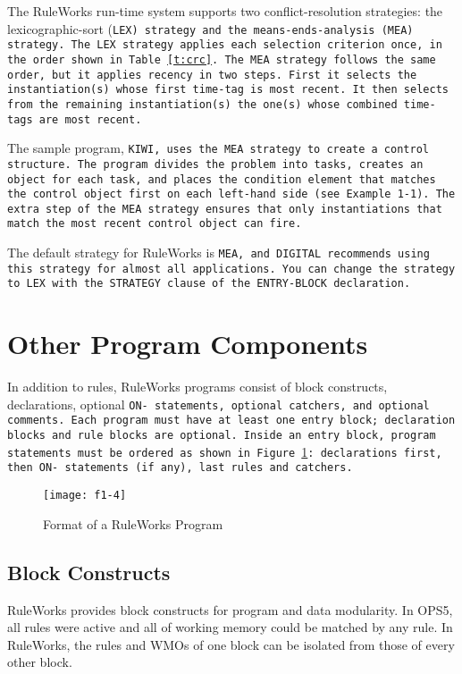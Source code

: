 The RuleWorks run-time system supports two conflict-resolution
strategies: the lexicographic-sort (\tt{LEX}) strategy and the
means-ends-analysis (\tt{MEA}) strategy. The \tt{LEX} strategy applies
each selection criterion once, in the order shown in
Table~\ref{t:crc}. The \tt{MEA} strategy follows the same order, but
it applies recency in two steps. First it selects the instantiation(s)
whose first time-tag is most recent. It then selects from the
remaining instantiation(s) the one(s) whose combined time-tags are
most recent.

The sample program, \tt{KIWI}, uses the \tt{MEA} strategy to create a
control structure. The program divides the problem into tasks, creates
an object for each task, and places the condition element that matches
the control object first on each left-hand side (see Example 1-1). The
extra step of the \tt{MEA} strategy ensures that only instantiations
that match the most recent control object can fire.

The default strategy for RuleWorks is \tt{MEA}, and DIGITAL recommends
using this strategy for almost all applications. You can change the
strategy to \tt{LEX} with the \tt{STRATEGY} clause of the
\tt{ENTRY-BLOCK} declaration.

\section{Other Program Components}

In addition to rules, RuleWorks programs consist of block constructs,
declarations, optional \tt{ON-} statements, optional catchers, and
optional comments. Each program must have at least one entry block;
declaration blocks and rule blocks are optional. Inside an entry
block, program statements must be ordered as shown in
Figure~\ref{f:1-4}: declarations first, then \tt{ON-} statements (if
any), last rules and catchers.

\begin{figure}[h]
  \texttt{[image: f1-4]}
  \caption{Format of a RuleWorks Program}
  \label{f:1-4}
\end{figure}

\subsection{Block Constructs}

RuleWorks provides block constructs for program and data
modularity. In OPS5, all rules were active and all of working memory
could be matched by any rule. In RuleWorks, the rules and WMOs of one
block can be isolated from those of every other block.

